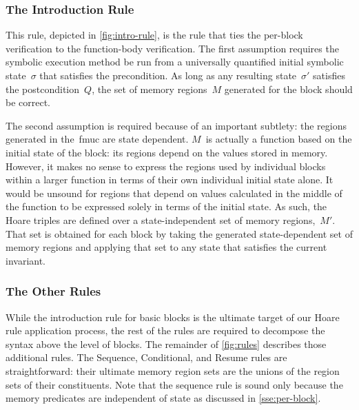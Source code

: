 \subsubsection{The Introduction Rule}
This rule, depicted in \cref{fig:intro-rule},
is the rule that ties the per-block verification to the function-body verification.
The first assumption requires the symbolic execution method be run
from a universally quantified initial symbolic state~$\sigma$ that satisfies the precondition.
As long as any resulting state~$\sigma'$ satisfies the postcondition~$Q$,
the set of memory regions~$M$ generated for the block should be correct.

The second assumption is required because of an important subtlety:
the regions generated in the~\ac{fmuc} are state dependent.
$M$~is actually a function based on the initial state of the block:
its regions depend on the values stored in memory.
However, it makes no sense to express the regions used by individual blocks
within a larger function in terms of their own individual initial state alone.
It would be unsound for regions that depend on values calculated
in the middle of the function to be expressed solely in terms of the initial state.
As such,
the Hoare triples are defined over a state-independent set of memory regions,~$M'$.
That set is obtained for each block
by taking the generated state-dependent set of memory regions
and applying that set to any state that satisfies the current invariant.

\subsubsection{The Other Rules}
While the introduction rule for basic blocks
is the ultimate target of our Hoare rule application process,
the rest of the rules are required to decompose the syntax above the level of blocks.
The remainder of \cref{fig:rules} describes those additional rules.
The Sequence, Conditional, and Resume rules are straightforward:
their ultimate memory region sets are the unions of the region sets of their constituents.
Note that the sequence rule is sound only because the memory predicates
are independent of state as discussed in \cref{sse:per-block}.

